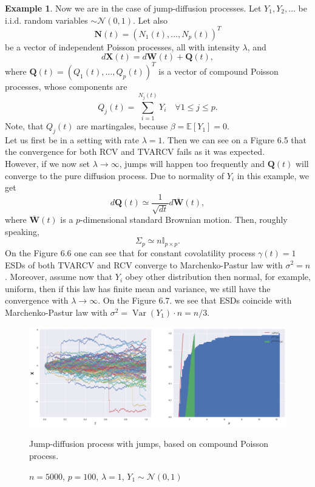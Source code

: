 \documentclass[a4paper,11pt]{book}
\theoremstyle{plain}
\theoremstyle{definition}
\newtheorem{exmp}[thm]{Example}
\newcommand{\ME}{\mathbb{E}}
\newcommand{\Var}{\operatorname{Var}}
\begin{document}
    \begin{exmp}
    	Now we are in the case of jump-diffusion processes. Let $Y_1, Y_2, \dots$ be i.i.d. random variables $\sim \mathcal{N}(0, 1)$. Let also 
    	\[ \mathbf{N}(t) = (N_1(t), \dots, N_p(t))^T \]
    	be a vector of independent Poisson processes, all with intensity $\lambda$, and
    	\[d\mathbf{X}(t) = d\mathbf{W}(t) + \mathbf{Q}(t),  \]
    	where $\mathbf{Q}(t) = (Q_1(t), \dots, Q_p(t))^T $ is a vector of compound Poisson processes, whose components are
    	\[ Q_j(t) = \sum_{i=1}^{N_j(t)} Y_i \quad \forall 1 \leq j \leq p. \]
    	Note, that $Q_j(t)$ are martingales, because $\beta = \ME[Y_1] = 0$. \\
    	Let us first be in a setting with rate $\lambda = 1$. Then we can see on a Figure 6.5 that the convergence for both RCV and TVARCV fails as it was expected. \\
    	However, if we now set $\lambda \rightarrow \infty$, jumps will happen too frequently and $\mathbf{Q}(t)$ will converge to the pure diffusion process. Due to normality of $Y_i$ in this example, we get
    	\[d\mathbf{Q}(t) \simeq \frac{1}{\sqrt{dt}} d\overline{\mathbf{W}}(t),  \]
    	where $\overline{\mathbf{W}}(t)$ is a $p$-dimensional standard Brownian motion. Then, roughly speaking,
    	\[ \Sigma_p \simeq n \mathbb{I}_{p \times p}. \]
    	On the Figure 6.6 one can see that for constant covolatility process $\gamma(t)=1$ ESDs of both TVARCV and RCV converge to Marchenko-Pastur law with $\sigma^2 = n$. Moreover, assume now that $Y_i$ obey other distribution then normal, for example, uniform, then if this law has finite mean and variance, we still have the convergence with $\lambda \rightarrow \infty$. On the Figure 6.7. we see that ESDs coincide with Marchenko-Pastur law with $\sigma^2 = \Var(Y_1) \cdot n = n/3$.
    \end{exmp}
    
    
    \begin{figure}[ht]
    	\begin{center} \centering
    		\includegraphics[scale=0.4]{Xjumps}
    		\caption{$n = 5000$, $p = 100$, $\lambda = 1$, $Y_1 \sim \mathcal{N}(0, 1)$}
    		\smallskip
    		\small
    		Jump-diffusion process with jumps, based on compound Poisson process.
    	\end{center}
    \end{figure}
    
\end{document}
